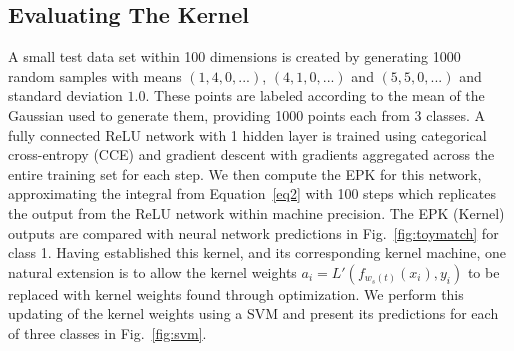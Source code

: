 \subsection{Evaluating The Kernel} \label{subsec:evaluate}
A small test data set within 100 dimensions is created by generating 1000 random samples with means $(1,4,0,...)$, $(4,1,0,...)$ and $(5,5,0,...)$ and standard deviation $1.0$. These points are labeled according to the mean of the Gaussian used to generate them, providing 1000 points each from 3 classes. A fully connected ReLU network with 1 hidden layer is trained using categorical cross-entropy (CCE) and gradient descent with gradients aggregated across the entire training set for each step. We then compute the EPK for this network, approximating the integral from Equation~\ref{eq2} with 100 steps which replicates the output from the ReLU network within machine precision. The EPK (Kernel) outputs are compared with neural network predictions in Fig.~\ref{fig:toymatch} for class 1. Having established this kernel, and its corresponding kernel machine, one natural extension is to allow the kernel weights $a_i = L'(f_{w_s(t)}(x_i), y_i)$ to be replaced with kernel weights found through optimization. We perform this updating of the kernel weights using a SVM and present its predictions for each of three classes in Fig.~\ref{fig:svm}.


